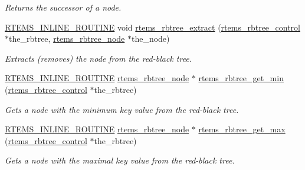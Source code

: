 \begin{DoxyCompactItemize}
\begin{DoxyCompactList}\small\item\em Returns the successor of a node. \end{DoxyCompactList}\item 
\mbox{\hyperlink{group__RTEMSScoreBaseDefs_gac216239df231d5dbd15e3520b0b9313f}{R\+T\+E\+M\+S\+\_\+\+I\+N\+L\+I\+N\+E\+\_\+\+R\+O\+U\+T\+I\+NE}} void \mbox{\hyperlink{group__ClassicRBTrees_gac42d79ad499c2243f75ebdb4df3edb5c}{rtems\+\_\+rbtree\+\_\+extract}} (\mbox{\hyperlink{group__ClassicRBTrees_ga21fe446d0b3cb8b25c814e93357753ef}{rtems\+\_\+rbtree\+\_\+control}} $\ast$the\+\_\+rbtree, \mbox{\hyperlink{group__ClassicRBTrees_gaef47fc7fc61856c9afbf7f18a26ff80d}{rtems\+\_\+rbtree\+\_\+node}} $\ast$the\+\_\+node)
\begin{DoxyCompactList}\small\item\em Extracts (removes) the node from the red-\/black tree. \end{DoxyCompactList}\item 
\mbox{\hyperlink{group__RTEMSScoreBaseDefs_gac216239df231d5dbd15e3520b0b9313f}{R\+T\+E\+M\+S\+\_\+\+I\+N\+L\+I\+N\+E\+\_\+\+R\+O\+U\+T\+I\+NE}} \mbox{\hyperlink{group__ClassicRBTrees_gaef47fc7fc61856c9afbf7f18a26ff80d}{rtems\+\_\+rbtree\+\_\+node}} $\ast$ \mbox{\hyperlink{group__ClassicRBTrees_gaf2f3d6be3886b350a0ef83d4225b74bc}{rtems\+\_\+rbtree\+\_\+get\+\_\+min}} (\mbox{\hyperlink{group__ClassicRBTrees_ga21fe446d0b3cb8b25c814e93357753ef}{rtems\+\_\+rbtree\+\_\+control}} $\ast$the\+\_\+rbtree)
\begin{DoxyCompactList}\small\item\em Gets a node with the minimum key value from the red-\/black tree. \end{DoxyCompactList}\item 
\mbox{\hyperlink{group__RTEMSScoreBaseDefs_gac216239df231d5dbd15e3520b0b9313f}{R\+T\+E\+M\+S\+\_\+\+I\+N\+L\+I\+N\+E\+\_\+\+R\+O\+U\+T\+I\+NE}} \mbox{\hyperlink{group__ClassicRBTrees_gaef47fc7fc61856c9afbf7f18a26ff80d}{rtems\+\_\+rbtree\+\_\+node}} $\ast$ \mbox{\hyperlink{group__ClassicRBTrees_ga358665bb5a3ebe142489530fb86af804}{rtems\+\_\+rbtree\+\_\+get\+\_\+max}} (\mbox{\hyperlink{group__ClassicRBTrees_ga21fe446d0b3cb8b25c814e93357753ef}{rtems\+\_\+rbtree\+\_\+control}} $\ast$the\+\_\+rbtree)
\begin{DoxyCompactList}\small\item\em Gets a node with the maximal key value from the red-\/black tree. \end{DoxyCompactList}\item 

\end{DoxyCompactItemize}
